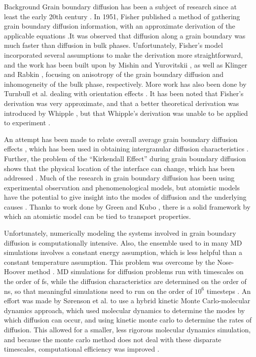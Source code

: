 \documentclass{article}
\begin{document}
\begin{section}{Background}
	Grain boundary diffusion has been a subject of research since at least the early 20th century \cite{GBDSilver}.  In 1951, Fisher published a method of gathering grain boundary diffusion information, with an approximate derivation of the applicable equations \cite{Fisher}.It was observed that diffusion along a grain boundary was much faster than diffusion in bulk phases. Unfortunately, Fisher's model incorporated several assumptions to make the derivation more straightforward, and the work has been built upon by Mishin and Yurovitskii \cite{GBDAnisotropic}, as well as Klinger and Rabkin \cite{GBDInhomogenous}, focusing on anisotropy of the grain boundary diffusion and inhomogeneity of the bulk phase, respectively. More work has also been done by Turnbull et al. dealing with orientation effects \cite{GBDOrientation}. It has been noted that Fisher's derivation was very approximate, and that a better theoretical derivation was introduced by Whipple \cite{Whipple}, but that Whipple's derivation was unable to be applied to experiment \cite{GBDAnalysis}.  
	
	An attempt has been made to relate overall average grain boundary diffusion effects \cite{GBDEffectiveMedium}, which has been used in obtaining intergranular diffusion characteristics \cite{DiffusionTripleJunction}. Further, the problem of the ``Kirkendall Effect'' during grain boundary diffusion shows that the physical location of the interface can change, which has been addressed \cite{GBDKirkendall}. Much of the research in grain boundary diffusion has been using experimental observation and phenomenological models, but atomistic models have the potential to give insight into the modes of diffusion and the underlying causes \cite{GBDReview}.  Thanks to work done by Green \cite{GreenIrreversible,GreenTimeDependent} and Kubo \cite{KuboGeneral,KuboStatMech}, there is a solid framework by which an atomistic model can be tied to transport properties.

	Unfortunately, numerically modeling the systems involved in grain boundary diffusion is computationally intensive.  Also, the ensemble used to in many MD simulations involves a constant energy assumption, which is less helpful than a constant temperature assumption. This problem was overcome by the Nose-Hoover method \cite{NoseHooverThermostat}.  MD simulations for diffusion problems run with timescales on the order of fs, while the diffusion characteristics are determined on the order of ns, so that meaningful simulations need to run on the order of $10^6$ timesteps \cite{MeltInsight}. An effort was made by S\o renson et al. to use a hybrid kinetic Monte Carlo-molecular dynamics approach, which used molecular dynamics to determine the modes by which diffusion can occur, and using kinetic monte carlo to determine the rates of diffusion. This allowed for a smaller, less rigorous molecular dynamics simulation, and because the monte carlo method does not deal with these disparate timescales, computational efficiency was improved \cite{GBDkMCMD}. 
	

\end{section}
\end{document}
